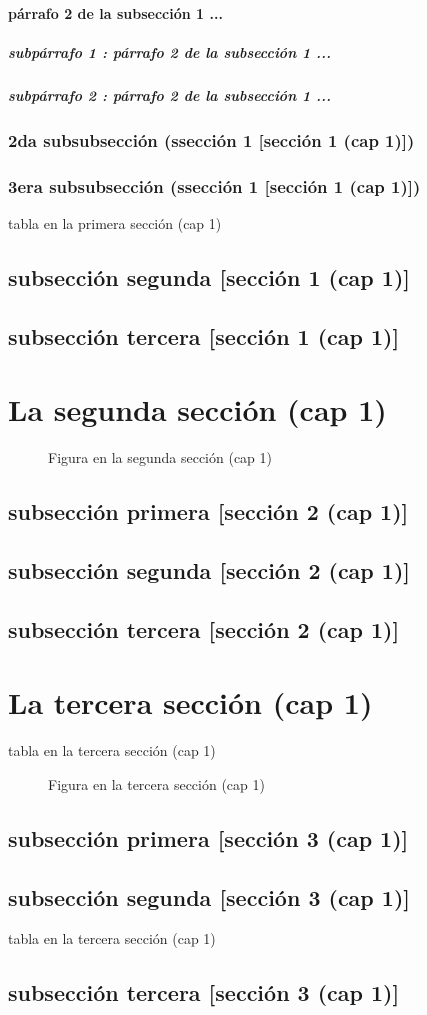 \documentclass[12pt,a4paper]{report}
\begin{document}
\paragraph{párrafo 2 de la subsección 1 ...}
\subparagraph{subpárrafo 1 : párrafo 2 de la subsección 1 ...}
\subparagraph{subpárrafo 2 : párrafo 2 de la subsección 1 ...}
\subsubsection{2da subsubsección (ssección 1 [sección 1 (cap 1)])}
\subsubsection{3era subsubsección (ssección 1 [sección 1 (cap 1)])}
\begin{table}[H]
\caption{tabla en la primera sección (cap 1)}
\end{table}
\subsection{subsección segunda [sección 1 (cap 1)]}
\subsection{subsección tercera [sección 1 (cap 1)]}
\section{La segunda sección (cap 1)}
\begin{figure}[H]
\caption{Figura en la segunda sección (cap 1)}
\end{figure}
\subsection{subsección primera [sección 2 (cap 1)]}
\subsection{subsección segunda [sección 2 (cap 1)]}
\subsection{subsección tercera [sección 2 (cap 1)]}
\section{La tercera sección (cap 1)}
\begin{table}[H]
\caption{tabla en la tercera sección (cap 1)}
\end{table}
\begin{figure}[H]
\caption{Figura en la tercera sección (cap 1)}
\end{figure}
\subsection{subsección primera [sección 3 (cap 1)]}
\subsection{subsección segunda [sección 3 (cap 1)]}
\begin{table}[H]
\caption{tabla en la tercera sección (cap 1)}
\end{table}
\subsection{subsección tercera [sección 3 (cap 1)]}
\end{document}
